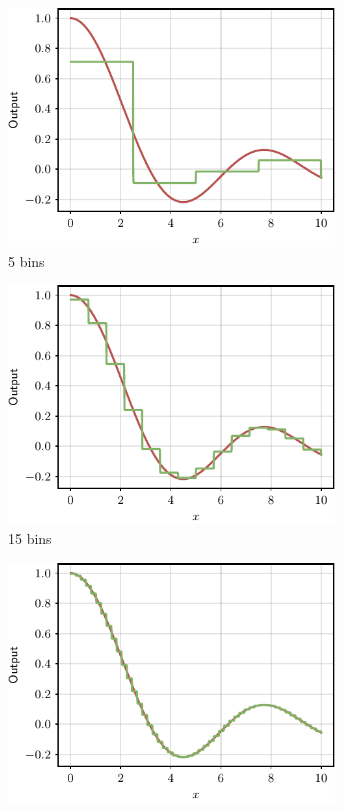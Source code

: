 \begin{figure}[t]
    \centering
    \begin{subfigure}[b]{0.32\textwidth}
    \includegraphics[width=0.95\textwidth]{images/sin_approximation_5.pdf}
    \caption{5 bins}
    \end{subfigure}
    \hfill
    \begin{subfigure}[b]{0.32\textwidth}
    \includegraphics[width=0.95\textwidth]{images/sin_approximation_15.pdf}
    \caption{15 bins}
    \end{subfigure}
    \hfill
    \begin{subfigure}[b]{0.32\textwidth}
    \includegraphics[width=0.95\textwidth]{images/sin_approximation_50.pdf}

\end{subfigure}
\end{figure}

